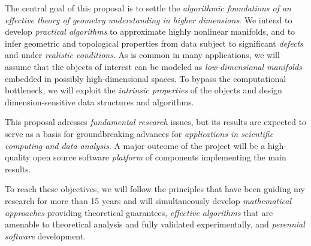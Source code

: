\documentclass[a4paper, 11pt]{article}
\begin{document}
The central goal of this proposal is to settle the {\em algorithmic
foundations of an effective theory of geometry understanding in higher
dimensions}.  We intend to develop {\em practical algorithms} to approximate
highly nonlinear manifolds, and to infer geometric and topological
properties from data subject to significant {\em defects} and under
{\em realistic conditions}. 
%
As is common in many applications, we will assume that  the objects of
interest can be modeled as {\em low-dimensional manifolds} 
embedded in possibly high-dimensional spaces.
To  bypass the computational bottleneck, we will 
exploit the {\em intrinsic properties} of the objects and design
dimension-sensitive data structures and algorithms.%

This proposal adresses {\em fundamental
  research} issues, but its results are expected to serve as a basis
for groundbreaking advances for {\em applications in scientific computing
and data analysis}.  A major outcome of the project will be a
high-quality open source software {\em platform} of components
implementing the main results.

To reach these objectives, we will follow the principles that have been
guiding my research for more than 15 years and will simultaneously
develop {\em mathematical approaches} providing theoretical
guarantees, {\em effective algorithms} that are amenable to
theoretical analysis and fully validated experimentally, and {\em
  perennial software} development.



\newpage

\end{document}
